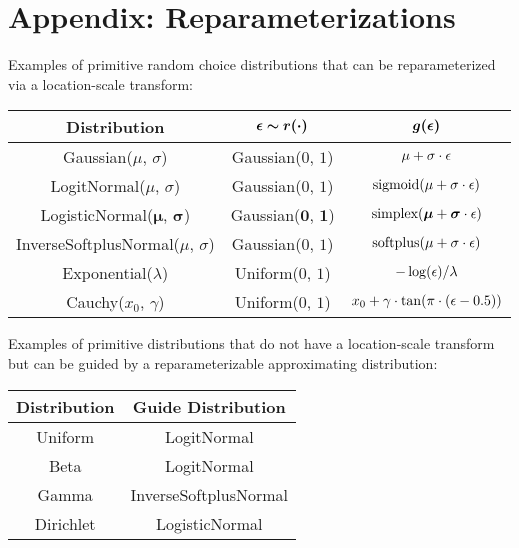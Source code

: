 
\section{Appendix: Reparameterizations}
\label{sec:appendix_reparam}

Examples of primitive random choice distributions that can be reparameterized via a location-scale transform:

\begin{center}
\renewcommand{\arraystretch}{1.5}
\begin{tabular}{c | c | c}
\textbf{Distribution} & $\bm{\epsilon \sim r(\cdot)}$ & $\bm{g(\epsilon)}$ \\
\hline
Gaussian($\mu$, $\sigma$) & Gaussian($0$, $1$) & $\mu + \sigma \cdot \epsilon$ \\
LogitNormal($\mu$, $\sigma$) & Gaussian($0$, $1$) & $\text{sigmoid}(\mu + \sigma \cdot \epsilon)$ \\
LogisticNormal($\bm{\mu}$, $\bm{\sigma}$) & Gaussian($\bm{0}$, $\bm{1}$) & $\text{simplex}(\bm{\mu} + \bm{\sigma} \cdot \epsilon)$ \\
InverseSoftplusNormal($\mu$, $\sigma$) & Gaussian($0$, $1$) & $\text{softplus}(\mu + \sigma \cdot \epsilon)$ \\
Exponential($\lambda$) & Uniform($0$, $1$) & $-\log(\epsilon) / \lambda$ \\
Cauchy($x_0$, $\gamma$) & Uniform($0$, $1$) & $x_0 + \gamma \cdot \tan( \pi \cdot (\epsilon - 0.5) )$
\end{tabular}
\end{center}

Examples of primitive distributions that do not have a location-scale transform but can be guided by a reparameterizable approximating distribution:

\begin{center}
\renewcommand{\arraystretch}{1.5}
\begin{tabular}{c | c}
\textbf{Distribution} & \textbf{Guide Distribution} \\
\hline
Uniform & LogitNormal \\
Beta & LogitNormal \\
Gamma & InverseSoftplusNormal \\
Dirichlet & LogisticNormal
\end{tabular}
\end{center}
